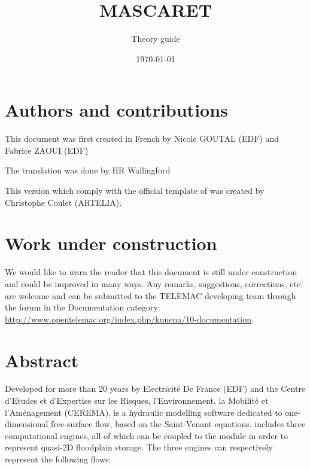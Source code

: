 \documentclass[Mascaret]{../../data/TelemacDoc} %
\begin{document}
\let\cleardoublepage\clearpage
\title{MASCARET}
\subtitle{Theory guide}
\version{\telmaversion}
\date{\today}
\maketitle
\clearpage


\newpage

\thispagestyle{empty}

\chapter*{Authors and contributions}
This document was first created in French by Nicole GOUTAL (EDF) and Fabrice ZAOUI (EDF)

The translation was done by HR Wallingford

This version which comply with the official template of \telemacsystem{} was created by Christophe Coulet (ARTELIA).

\newpage

\chapter*{Work under construction}\label{workunderconstruction}
We would like to warn the reader that this document is still under construction and
could be improved in many ways. Any remarks, suggestions, corrections, etc. are welcome
and can be submitted to the TELEMAC developing team through the forum in the Documentation
category: \url{http://www.opentelemac.org/index.php/kunena/10-documentation}.

\newpage

\chapter*{Abstract}\label{Abstract}
Developed for more than 20 years by Electricité De France (EDF) and the Centre d'Etudes et d'Expertise sur les Risques, l'Environnement, la Mobilité et l'Aménagement (CEREMA), \mascaret{} is a hydraulic modelling software dedicated to one-dimensional free-surface flow, based on the Saint-Venant equations.
\mascaret{} includes three computational engines, all of which can be coupled to the \casier{} module in order to represent quasi-2D floodplain storage. The three engines can respectively represent the following flows:
\end{document}
